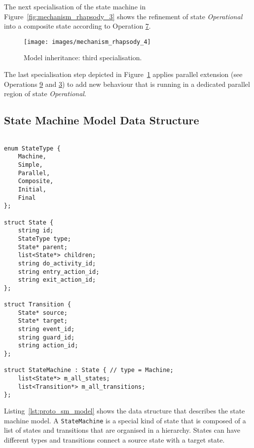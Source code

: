 The next specialisation of the state machine in Figure~\ref{fig:mechanism_rhapsody_3} shows the
refinement of state \textit{Operational} into a composite state according to Operation
\hyperref[sec:operation_7]{7}.

\clearpage

\begin{figure}[H]
    \centering
    \texttt{[image: images/mechanism\_rhapsody\_4]}
    \caption{Model inheritance: third specialisation.}
    \label{fig:mechanism_rhapsody_4}
\end{figure}

The last specialisation step depicted in Figure~\ref{fig:mechanism_rhapsody_4} applies parallel
extension (see Operations \hyperref[sec:operation_9]{9} and \hyperref[sec:operation_3]{3}) to add
new behaviour that is running in a dedicated parallel region of state \textit{Operational}.


\clearpage
\subsection{State Machine Model Data Structure\label{annex:proto_delta}}

\begin{lstlisting}[language=CXX, label={lst:proto_sm_model}, caption={State machine model data structure.}]

enum StateType {
    Machine,
    Simple,
    Parallel,
    Composite,
    Initial,
    Final
};

struct State {
    string id;
    StateType type;
    State* parent;
    list<State*> children;
    string do_activity_id;
    string entry_action_id;
    string exit_action_id;
};

struct Transition {
    State* source;
    State* target;
    string event_id;
    string guard_id;
    string action_id;
};

struct StateMachine : State { // type = Machine;
    list<State*> m_all_states;
    list<Transition*> m_all_transitions;
};

\end{lstlisting}

Listing~\ref{lst:proto_sm_model} shows the data structure that describes the state machine model.
A \lstinline{StateMachine} is a special kind of state that is composed of a list of states and
transitions that are organised in a hierarchy. States can have different types and transitions
connect a source state with a target state.


